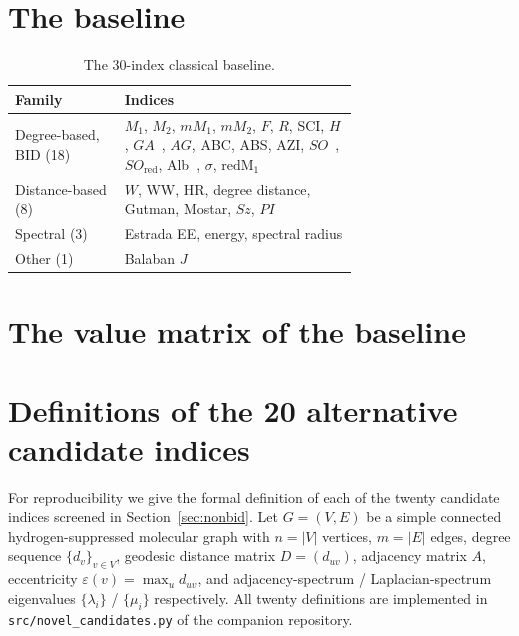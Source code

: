 \section{The baseline}\label{sup:baseline}
\begin{table}[H]
\centering
\small
\caption{The $30$-index classical baseline.}
\label{tab:baseline}
\begin{tabular}{lp{0.68\linewidth}}
\toprule
Family & Indices\\
\midrule
Degree-based, BID (18) & $M_1$, $M_2$, $mM_1$, $mM_2$, $F$, $R$, SCI, $H$, $GA$~\cite{VukicevicFurtula2009GA}, $AG$, ABC, ABS, AZI, $SO$~\cite{Gutman2021Sombor}, $SO_{\mathrm{red}}$, Alb~\cite{Albertson1997}, $\sigma$, $\mathrm{redM}_1$\\
Distance-based (8) & $W$, WW, HR, degree distance, Gutman, Mostar, $Sz$, $PI$\\
Spectral (3) & Estrada EE, energy, spectral radius\\
Other (1) & Balaban $J$\\
\bottomrule
\end{tabular}
\end{table}

\section{The value matrix of the baseline}\label{sup:phi}


\section{Definitions of the 20 alternative candidate indices}\label{app:candidates}
For reproducibility we give the formal definition of each of the
twenty candidate indices screened in Section~\ref{sec:nonbid}. Let
$G = (V, E)$ be a simple connected hydrogen-suppressed molecular
graph with $n = |V|$ vertices, $m = |E|$ edges, degree sequence
$\{d_v\}_{v\in V}$, geodesic distance matrix $D = (d_{uv})$,
adjacency matrix $A$, eccentricity $\varepsilon(v) = \max_u d_{uv}$,
and adjacency-spectrum / Laplacian-spectrum eigenvalues
$\{\lambda_i\}$ / $\{\mu_i\}$ respectively. All twenty definitions
are implemented in
\texttt{src/novel\_candidates.py} of the companion repository.

